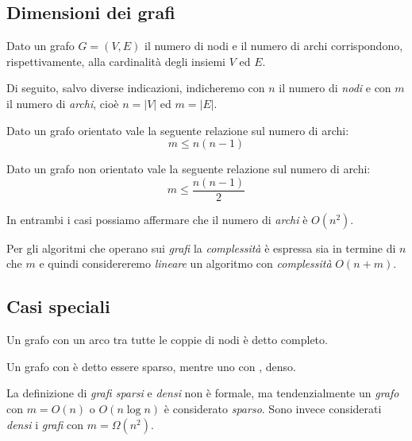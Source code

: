 \subsection{Dimensioni dei grafi}
\begin{definition}
    Dato un grafo $G=(V,E)$ il numero di nodi e il numero di archi corrispondono,
    rispettivamente, alla cardinalità degli insiemi $V$ ed $E$.
\end{definition}
\begin{note}
    Di seguito, salvo diverse indicazioni, indicheremo con $n$ il numero di
    \emph{nodi} e con $m$ il numero di \emph{archi}, cioè $n=|V|$ ed $m=|E|$.
\end{note}

\begin{definition}
    Dato un grafo orientato vale la seguente relazione sul numero di
    archi:
    \[m\leq n(n-1)\]
\end{definition}
\begin{definition}
    Dato un grafo non orientato vale la seguente relazione sul numero
    di archi:
    \[m\leq\frac{n(n-1)}{2}\]
\end{definition}
\begin{note}
    In entrambi i casi possiamo affermare che il numero di \emph{archi} è $O(n^2)$.
\end{note}
\begin{note}
    Per gli algoritmi che operano sui \emph{grafi} la \emph{complessità} è espressa
    sia in termine di $n$ che $m$ e quindi considereremo \emph{lineare} un
    algoritmo con \emph{complessità} $O(n+m)$.
\end{note}

\subsection{Casi speciali}
\begin{definition}
    Un grafo con un arco tra tutte le coppie di nodi è detto completo.
\end{definition}
\begin{definition}
    Un grafo con  è detto essere sparso, mentre uno con , denso.
\end{definition}
\begin{note}
    La definizione di \emph{grafi sparsi} e \emph{densi} non è formale, ma
    tendenzialmente un \emph{grafo} con $m=O(n)$ o $O(n\log n)$ è considerato
    \emph{sparso}. Sono invece considerati \emph{densi} i \emph{grafi} con
    $m=\Omega(n^2)$.
\end{note}

